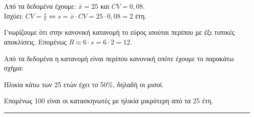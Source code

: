
\begin{alist}
	\item Από τα δεδομένα έχουμε: $\bar{x} = 25$ και $CV = 0,08$. \\
	      Ισχύει: $CV = \frac{s}{\bar{x}} \Leftrightarrow s = \bar{x} \cdot CV = 25 \cdot 0,08 = 2$ έτη.
	      
	\item Γνωρίζουμε ότι στην κανονική κατανομή το εύρος ισούται περίπου με έξι τυπικές αποκλίσεις. Επομένως $R \approx 6 \cdot s = 6 \cdot 2 = 12$.
	      
	\item Από τα δεδομένα η κατανομή είναι περίπου κανονική οπότε έχουμε το παρακάτω σχήμα:
\end{alist}

\begin{center}
%			
%			
%			
\end{center}

Ηλικία κάτω των 25 ετών έχει το 50\%, δηλαδή οι μισοί.
\par
Επομένως 100 είναι οι κατασκηνωτές με ηλικία μικρότερη από τα 25 έτη.
\vspace{6mm}
\noindent\rule{\textwidth}{0.4pt}
\vspace{6mm}

